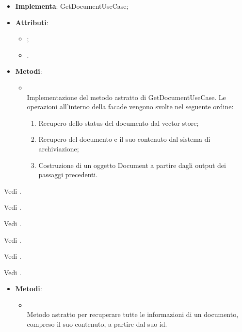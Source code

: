 \documentclass[10pt, a4paper]{article}
\begin{document}
\label{GetDocumentFacadeServiceDettaglio}
\begin{itemize}
    \item \textbf{Implementa}: GetDocumentUseCase;
    \item \textbf{Attributi}:
    \begin{itemize}
        \item {};
        \item {}.
    \end{itemize}
    \item \textbf{Metodi}:
    \begin{itemize}
        \item {}\\
        Implementazione del metodo astratto di GetDocumentUseCase. Le operazioni all'interno della facade vengono svolte nel seguente ordine:
        \begin{enumerate}
            \item Recupero dello status del documento dal vector store;
            \item Recupero del documento e il suo contenuto dal sistema di archiviazione;
            \item Costruzione di un oggetto Document a partire dagli output dei passaggi precedenti.
        \end{enumerate}
    \end{itemize}
\end{itemize}

Vedi .

Vedi .

Vedi .


Vedi .



Vedi .


Vedi .


\label{GetDocumentUseCaseDettaglio}
\begin{itemize}
    \item \textbf{Metodi}:
    \begin{itemize}
        \item {}\\
        Metodo astratto per recuperare tutte le informazioni di un documento, compreso il suo contenuto, a partire dal suo id.
    \end{itemize}
\end{itemize}
\end{document}
